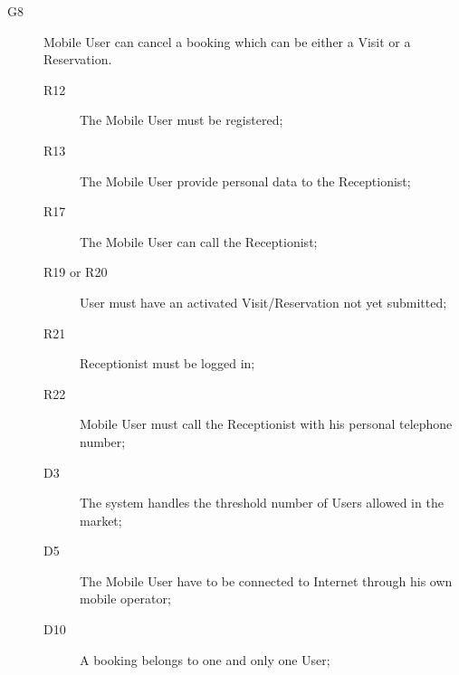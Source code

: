 \begin{description}
    \item[G8]Mobile User can cancel a booking which can be either a Visit or a Reservation.
    \begin{description}
    \item[R12] The Mobile User must be registered; %
    \item[R13] The Mobile User provide personal data to the Receptionist; %
    \item[R17] The Mobile User can call the Receptionist;  
    \item[R19 or R20] User must have an activated Visit/Reservation not yet submitted;
    \item[R21] Receptionist must be logged in;
    \item[R22] Mobile User must call the Receptionist with his personal telephone number;
    \item[D3] The system handles the threshold number of Users allowed in the market;
    \item[D5] The Mobile User have to be connected to Internet through his own mobile operator;
    \item[D10] A booking belongs to one and only one User;
    \end{description}
    
    
\end{description}

